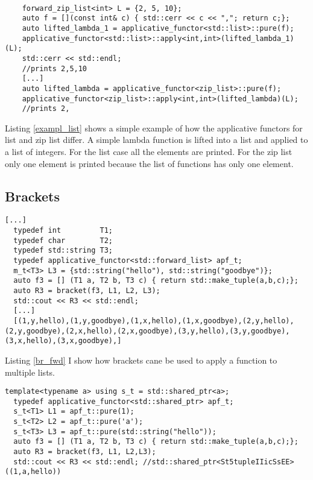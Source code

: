 \documentclass[12pt,fleqn]{article}
\begin{document}
%
%
%
\begin{minipage}{\linewidth}
\begin{lstlisting}[caption=the applicative functor for list and ziplist, label=exampl_list]

	forward_zip_list<int> L = {2, 5, 10};
	auto f = [](const int& c) { std::cerr << c << ","; return c;};
	auto lifted_lambda_1 = applicative_functor<std::list>::pure(f);
	applicative_functor<std::list>::apply<int,int>(lifted_lambda_1)(L);
	std::cerr << std::endl;
    //prints 2,5,10
    [...]
	auto lifted_lambda = applicative_functor<zip_list>::pure(f);
	applicative_functor<zip_list>::apply<int,int>(lifted_lambda)(L);
    //prints 2,
\end{lstlisting}
\end{minipage}
%
%
%

Listing \ref{exampl_list} shows a simple example of how the applicative functors for list and zip list differ. 
A simple lambda function is lifted into a list and applied to a list of integers. 
For the list case all the elements are printed. For the zip list only one element is printed because the list of functions has only one element.
   
%
%
%
\subsection{Brackets}
%
%
%
%
\begin{minipage}{\linewidth}
\begin{lstlisting}[caption=applicative functor for the std::forward\_list using brackets, label=br_fwd]
[...]
  typedef int         T1;
  typedef char        T2;
  typedef std::string T3;
  typedef applicative_functor<std::forward_list> apf_t;
  m_t<T3> L3 = {std::string("hello"), std::string("goodbye")};
  auto f3 = [] (T1 a, T2 b, T3 c) { return std::make_tuple(a,b,c);};
  auto R3 = bracket(f3, L1, L2, L3);
  std::cout << R3 << std::endl;
  [...]
  [(1,y,hello),(1,y,goodbye),(1,x,hello),(1,x,goodbye),(2,y,hello),(2,y,goodbye),(2,x,hello),(2,x,goodbye),(3,y,hello),(3,y,goodbye),(3,x,hello),(3,x,goodbye),]
\end{lstlisting}
\end{minipage}
%
%
%

Listing \ref{br_fwd} I show how brackets cane be used to apply a function to multiple lists.

%
%
%
\begin{minipage}{\linewidth}
\begin{lstlisting}[caption=applicative functor for shared pointers applied using bracket notation, label=br_ptr]
  template<typename a> using s_t = std::shared_ptr<a>;
  typedef applicative_functor<std::shared_ptr> apf_t;
  s_t<T1> L1 = apf_t::pure(1);
  s_t<T2> L2 = apf_t::pure('a');
  s_t<T3> L3 = apf_t::pure(std::string("hello"));
  auto f3 = [] (T1 a, T2 b, T3 c) { return std::make_tuple(a,b,c);};
  auto R3 = bracket(f3, L1, L2,L3);
  std::cout << R3 << std::endl; //std::shared_ptr<St5tupleIIicSsEE>((1,a,hello))
\end{lstlisting}
\end{minipage}
%
%
%
\end{document}
